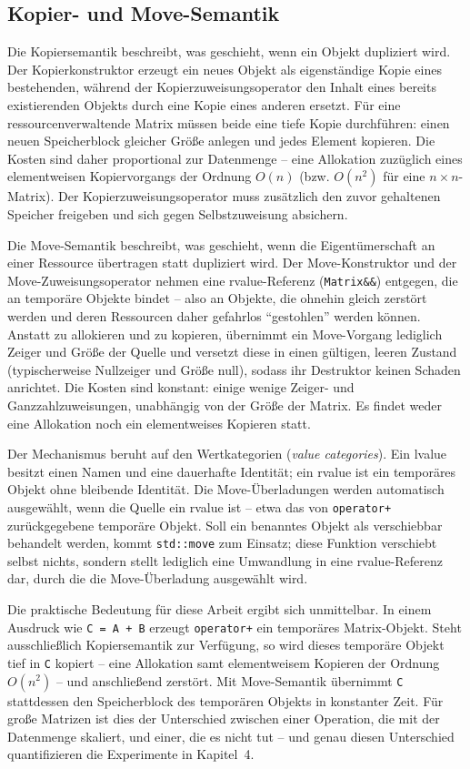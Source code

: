 \documentclass[10pt,a4paper]{article}
\begin{document}
\subsection{Kopier- und Move-Semantik}
Die Kopiersemantik beschreibt, was geschieht, wenn ein Objekt dupliziert
wird. Der Kopierkonstruktor erzeugt ein neues Objekt als eigenständige
Kopie eines bestehenden, während der Kopierzuweisungsoperator den Inhalt
eines bereits existierenden Objekts durch eine Kopie eines anderen
ersetzt. Für eine ressourcenverwaltende Matrix müssen beide eine tiefe
Kopie durchführen: einen neuen Speicherblock gleicher Größe anlegen
und jedes Element kopieren. Die Kosten sind daher proportional zur
Datenmenge -- eine Allokation zuzüglich eines elementweisen
Kopiervorgangs der Ordnung \(O(n)\) (bzw. \(O(n^2)\) für eine
\(n \times n\)-Matrix). Der Kopierzuweisungsoperator muss zusätzlich
den zuvor gehaltenen Speicher freigeben und sich gegen Selbstzuweisung
absichern.

Die Move-Semantik beschreibt, was geschieht, wenn die Eigentümerschaft an
einer Ressource übertragen statt dupliziert wird. Der Move-Konstruktor
und der Move-Zuweisungsoperator nehmen eine rvalue-Referenz
(\texttt{Matrix\&\&}) entgegen, die an temporäre Objekte bindet -- also
an Objekte, die ohnehin gleich zerstört werden und deren Ressourcen
daher gefahrlos ``gestohlen'' werden können. Anstatt zu allokieren und
zu kopieren, übernimmt ein Move-Vorgang lediglich Zeiger und Größe der
Quelle und versetzt diese in einen gültigen, leeren Zustand
(typischerweise Nullzeiger und Größe null), sodass ihr Destruktor keinen
Schaden anrichtet. Die Kosten sind konstant: einige wenige Zeiger- und
Ganzzahlzuweisungen, unabhängig von der Größe der Matrix. Es findet
weder eine Allokation noch ein elementweises Kopieren statt.

Der Mechanismus beruht auf den Wertkategorien (\emph{value categories}).
Ein lvalue besitzt einen Namen und eine dauerhafte Identität; ein rvalue
ist ein temporäres Objekt ohne bleibende Identität. Die
Move-Überladungen werden automatisch ausgewählt, wenn die Quelle ein
rvalue ist -- etwa das von \texttt{operator+} zurückgegebene temporäre
Objekt. Soll ein benanntes Objekt als verschiebbar behandelt werden,
kommt \texttt{std::move} zum Einsatz; diese Funktion verschiebt selbst
nichts, sondern stellt lediglich eine Umwandlung in eine rvalue-Referenz
dar, durch die die Move-Überladung ausgewählt wird.

Die praktische Bedeutung für diese Arbeit ergibt sich unmittelbar. In
einem Ausdruck wie \texttt{C = A + B} erzeugt \texttt{operator+} ein
temporäres Matrix-Objekt. Steht ausschließlich Kopiersemantik zur
Verfügung, so wird dieses temporäre Objekt tief in \texttt{C} kopiert
-- eine Allokation samt elementweisem Kopieren der Ordnung \(O(n^2)\) --
und anschließend zerstört. Mit Move-Semantik übernimmt
\texttt{C} stattdessen den Speicherblock des temporären Objekts in
konstanter Zeit. Für große Matrizen ist dies der Unterschied zwischen
einer Operation, die mit der Datenmenge skaliert, und einer, die es nicht
tut -- und genau diesen Unterschied quantifizieren die Experimente in
Kapitel~4.
\end{document}

